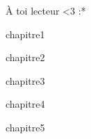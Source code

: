 \documentclass{these-ISSS} %
\begin{document}

  

  \maketitle

  \begin{dedicace}
    À toi lecteur <3 :*
  \end{dedicace}

  \cleardoublepage

  

  

  \tableofcontents

  \mainmatter

  {chapitre1}
  
  {chapitre2}
  
  {chapitre3}
  
  {chapitre4}
  
  {chapitre5}
  
  
  
  

  \backmatter

  \renewcommand{\bibtitle}{\bibchapter}
  
  

  \renewcommand{\bibtitle}{\section*{\refname}}

  \listoffigures

  \renewcommand{\listtheoremname}{Liste des définitions}
  \listoftheorems[ignoreall,show={definition}]

  \renewcommand{\listtheoremname}{Liste des exemples}
  \listoftheorems[ignoreall,show={example}]

  \listofalgorithms


  \appendix
  
\end{document}
